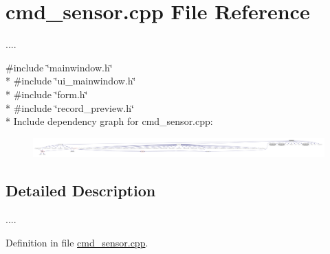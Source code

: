 \hypertarget{a00030}{\section{cmd\+\_\+sensor.\+cpp File Reference}
\label{a00030}
}


....  


{\ttfamily \#include \char`\"{}mainwindow.\+h\char`\"{}}\\*
{\ttfamily \#include \char`\"{}ui\+\_\+mainwindow.\+h\char`\"{}}\\*
{\ttfamily \#include \char`\"{}form.\+h\char`\"{}}\\*
{\ttfamily \#include \char`\"{}record\+\_\+preview.\+h\char`\"{}}\\*
Include dependency graph for cmd\+\_\+sensor.\+cpp\+:
\nopagebreak
\begin{figure}[H]
\begin{center}
\leavevmode
\includegraphics[width=350pt]{da/ddb/a00145}
\end{center}
\end{figure}


\subsection{Detailed Description}
.... 



Definition in file \hyperlink{a00030_source}{cmd\+\_\+sensor.\+cpp}.

